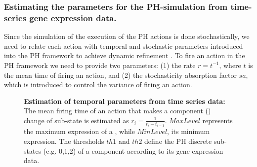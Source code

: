 
\subsubsection{Estimating the parameters for the PH-simulation from time-series gene expression data.}
\label{sssec:EPTSD}

Since the simulation of the execution of the PH actions is done stochastically, we need to relate each action with temporal 
and stochastic parameters introduced into the PH framework to achieve dynamic refinement \cite{PMR10-TCSB}. 
To fire an action in the PH framework we need to provide two parameters: (1) the rate $r=t^{-1}$, where $t$ is the mean time of firing an action,
and (2) the stochasticity absorption factor $sa$, which is introduced to control the variance of firing an action.


\begin{figure}[H]
\centering

	    

\caption{{\bf Estimation of temporal parameters from time series data:} The mean firing time of an action that makes a
component () change of sub-state is estimated as $r_{i}=\frac{1}{t_{i}-t_{i-1}}$. $MaxLevel$ represents the maximum expression of a , while 
 $MinLevel$, its minimum expression.
The thresholds $th1$ and $th2$ define the PH discrete sub-states (e.g. 0,1,2) of a component according to its gene expression data.
\label{fig:estimationParameter}}
\end{figure}



